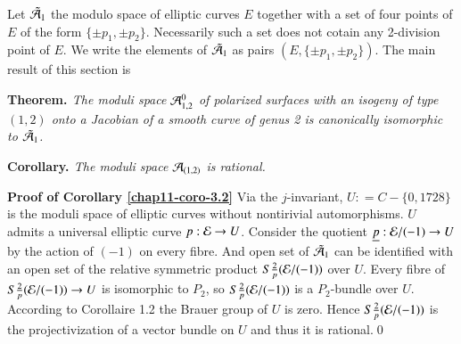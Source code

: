 Let $\tilde{\mathcal{A}}_{1}$ the modulo space of elliptic curves $E$ together with a set of four points of $E$ of the form $\{\pm p_{1}, \pm p_{2}\}$. Necessarily such a set does not cotain any 2-division point of $E$. We write the elements of $\tilde{\mathcal{A}}_{1}$ as pairs $(E, \{\pm p_{1}, \pm p_{2}\})$. The main result of this section is

\medskip
\noindent
{\bfseries {} Theorem. \label{chap11-thm-3.1}} \textit{ The moduli space $\mathcal{A}^{0}_{1,2}$ of polarized surfaces with an isogeny of type $(1, 2)$ onto a Jacobian of a smooth curve of genus 2 is canonically isomorphic to $\tilde{\mathcal{A}}_{1}$.}


\medskip
\noindent
{\bfseries {} Corollary. \label{chap11-coro-3.2}} \textit{The moduli space $\mathcal{A}_{(1,2)}$ is rational.}


\medskip
\noindent
{\bfseries  Proof of Corollary \ref{chap11-coro-3.2}} Via the $j$-invariant, $U : = C-\{0,1728\}$ is the moduli space of elliptic curves without nontirivial automorphisms. $U$ admits a universal elliptic curve $p:\mathcal{E} \rightarrow U$. Consider the quotient $\underline{p} : \mathcal{E} /(-1)\rightarrow U$ by the action of $(-1)$ on every fibre. And open set of $\tilde{\mathcal{A}}_{1}$ can be identified with an open set of the relative symmetric product $S\tfrac{2}{p}(\mathcal{E} /(-1))$ over $U$. Every fibre of $S\tfrac{2}{p}(\mathcal{E} /(-1))\rightarrow U$ is isomorphic to $P_{2}$, so $S\tfrac{2}{p}(\mathcal{E} /(-1))$ is a $P_{2}$-bundle over $U$. According to \cite{chap11-keyG} Corollaire 1.2 the Brauer group of $U$ is zero. Hence $S\frac{2}{p}(\mathcal{E}/(-1))$ is the projectivization of a vector bundle on $U$ and thus it is rational.\qed


